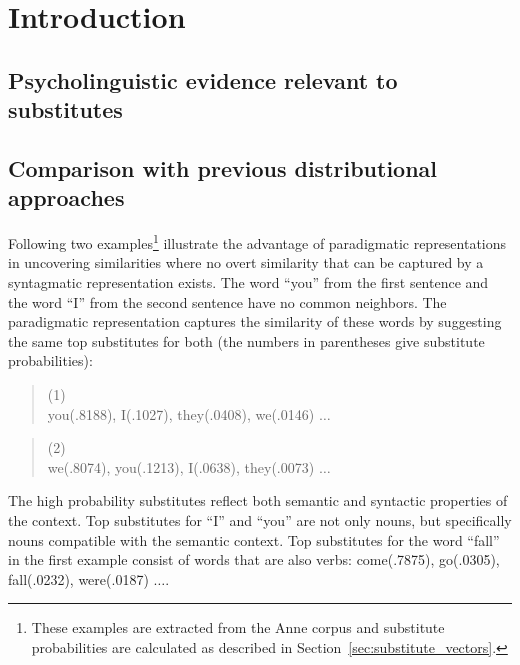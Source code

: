 \section{Introduction}
\label{sec:introduction}
\subsection{Psycholinguistic evidence relevant to substitutes}

\subsection{Comparison with previous distributional approaches}

Following two examples\footnote{These examples are extracted from the Anne
corpus and substitute probabilities are calculated as described in
Section~\ref{sec:substitute_vectors}.} illustrate the advantage of paradigmatic
representations in uncovering similarities where no overt similarity that can
be captured by a syntagmatic representation exists. The word ``you'' from the
first sentence and the word ``I'' from the second sentence have no common
neighbors.  The paradigmatic representation captures the similarity of these
words by suggesting the same top substitutes for both (the numbers in
parentheses give substitute probabilities): 

\begin{quote}
  \small
  (1) \\
   you(.8188), I(.1027), they(.0408), we(.0146) $\ldots$
\end{quote}

\begin{quote}
  \small
  (2) \\
   we(.8074), you(.1213), I(.0638), they(.0073) $\ldots$
\end{quote}

The high probability substitutes reflect both semantic and syntactic properties
of the context.  Top substitutes for ``I'' and ``you'' are not only nouns, but
specifically nouns compatible with the semantic context.  Top substitutes for
the word ``fall'' in the first example consist of words that are also  verbs:
come(.7875), go(.0305), fall(.0232), were(.0187) $\ldots$.


